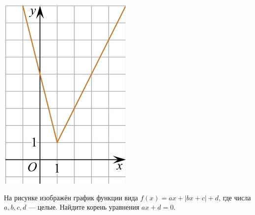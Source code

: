 \begin{class}[number=5]
\begin{listofex}
\begin{minipage}[c]{0.17\textwidth}
			\includegraphics[align=t, width=\textwidth]{pics/G101M4C5-6.jpg}
		\end{minipage}
		\item
		\begin{minipage}[t]{0.43\textwidth}
			На рисунке изображён график функции вида \(f(x)=ax+|bx+c|+d\), где числа \(a, b, c, d\) --- целые. Найдите корень уравнения \(ax+d=0\).
		\end{minipage}
		\begin{minipage}[c]{0.17\textwidth}

\end{minipage}
\end{listofex}
\end{class}
